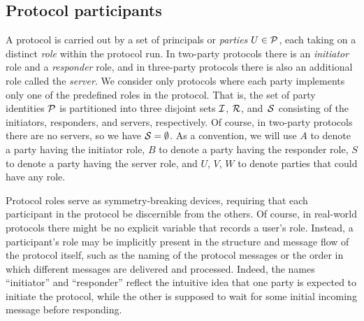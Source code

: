 \subsection{Protocol participants}\label{sec:definitions:unified:participants}
A protocol is carried out by a set of principals or \emph{parties} $U \in \mathcal{P}$,
each taking on a distinct \emph{role} within the protocol run.
In two-party protocols there is an \emph{initiator} role and a \emph{responder} role,
and in three-party protocols there is also an additional role called the \emph{server}.
We consider only protocols where each party implements only one of the predefined roles in the protocol.
That is,
the set of party identities  $\mathcal{P}$ is partitioned into three disjoint sets $\mathcal{I}$, $\mathcal{R}$, and~$\mathcal{S}$
consisting of the initiators, responders, and servers,
respectively.
Of course,
in two-party protocols there are no servers, 
so we have $\mathcal{S} = \emptyset$.
As a convention, 
we will use $A$ to denote a party having the initiator role,
$B$ to denote a party having the responder role,
$S$ to denote a party having the server role,
and $U$, $V$, $W$ to denote parties that could have any role.




Protocol roles serve as symmetry-breaking devices,
requiring that each participant in the protocol be discernible from the others.
Of course,
in real-world protocols there might be no explicit variable that records a user's role.
Instead,
a participant's role may be implicitly present in the structure and message flow of the protocol itself,
such as the naming of the protocol messages or the order in which different messages are delivered and processed. 
Indeed,
the names ``initiator'' and ``responder'' reflect the intuitive idea that one party is expected to initiate the protocol,
while the other is supposed to wait for some initial incoming message before responding.   

